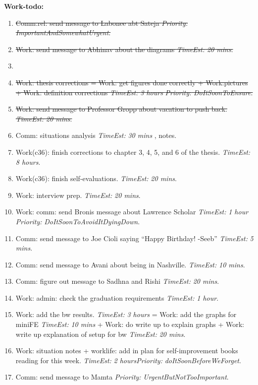 \documentclass[11pt]{article}
\newcommand{\doneTask}[1]{\item \sout{\small #1}}
\newcommand{\te}[1]{\textit{TimeEst:} \textit{#1}}
\newcommand{\priority}[1]{\textit{Priority:} \textit{#1}}
\newcommand{\prio}[1]{\textit{Priority:} \textit{#1}}
\begin{document}
\textbf{Work-todo:}\\ 
\begin{enumerate} 

\doneTask{ Comm:rel: send message to Labonee abt Sateja
  \priority{ImportantAndSomewhatUrgent}.} 



\doneTask{ Work: send message to Abhinav about the diagrams \te{20 mins}. } 

\item \doneTask{Work: thesis corrections = Work: get figures done correctly +
  Work:pictures + Work: definition corrections \te{3 hours}
  \prio{DoItSoonToEnsure}. } 

\doneTask{ Work: send message to Professor Gropp about vacation to push
  back. \te{20 mins}. } 


\item  Comm: situations analysis \te{ 30 mins }, notes.


\item Work(c36): finish corrections to chapter 3, 4, 5, and 6 of the
  thesis. \te{8 hours}. 

\item Work(c36): finish self-evaluations. \te{20 mins}. 
\item Work: interview prep. \te{20 mins}. 


\item Work: comm: send Bronis message about Lawrence Scholar \te{1 hour} \prio{DoItSoonToAvoidItDyingDown}. 


\item Comm: send message to Joe Cioli saying ``Happy Birthday! -Seeb''
  \te{5 mins}.

\item Comm: send message to Avani about being in Nashville. \te{10
  mins}. 

\item Comm: figure out message to Sadhna and Rishi \te{20 mins}. 



\item Work: admin: check the graduation requirements \te{1 hour}.

\item Work: add the bw results. \te{3 hours}  =  Work: add the graphs
  for miniFE \te{10 mins}   +  Work: do write up to explain graphs +
  Work: write up explanation of setup for bw  \te{20 mins}. 

\item Work: situation notes + worklife: add in plan for
  self-improvement books reading for this week.  \te{2
    hours}\prio{doItSoonBeforeWeForget}. 

\item Comm: send message to Mamta
  \priority{UrgentButNotTooImportant}. 

\end{enumerate}
 
\end{document}
